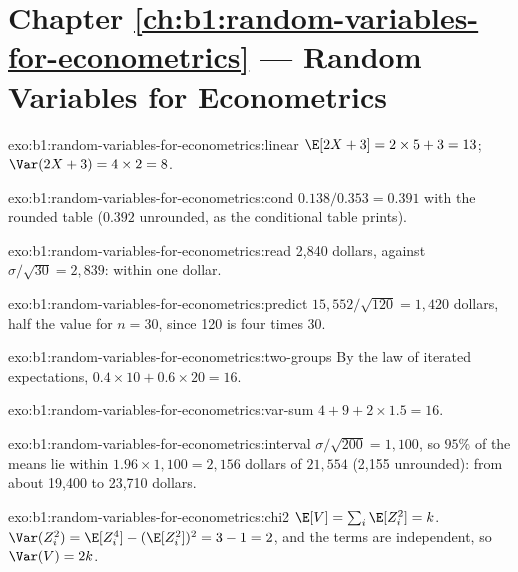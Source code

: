 \section*{Chapter \ref{ch:b1:random-variables-for-econometrics} --- Random Variables for Econometrics}

\begin{solution}{exo:b1:random-variables-for-econometrics:linear}
$\E[2X + 3] = 2 \times 5 + 3 = 13$; $\Var(2X + 3) = 4 \times 2 = 8$.
\end{solution}

\begin{solution}{exo:b1:random-variables-for-econometrics:cond}
$0.138/0.353 = 0.391$ with the rounded table ($0.392$ unrounded, as the
conditional table prints).
\end{solution}

\begin{solution}{exo:b1:random-variables-for-econometrics:read}
2,840 dollars, against $\sigma/\sqrt{30} = 2{,}839$: within one dollar.
\end{solution}

\begin{solution}{exo:b1:random-variables-for-econometrics:predict}
$15{,}552/\sqrt{120} = 1{,}420$ dollars, half the value for $n = 30$, since 120 is four
times 30.
\end{solution}

\begin{solution}{exo:b1:random-variables-for-econometrics:two-groups}
By the law of iterated expectations, $0.4 \times 10 + 0.6 \times 20 = 16$.
\end{solution}

\begin{solution}{exo:b1:random-variables-for-econometrics:var-sum}
$4 + 9 + 2 \times 1.5 = 16$.
\end{solution}

\begin{solution}{exo:b1:random-variables-for-econometrics:interval}
$\sigma/\sqrt{200} = 1{,}100$, so $95\%$ of the means lie within $1.96 \times 1{,}100 = 2{,}156$ dollars
of $21{,}554$ (2,155 unrounded): from about 19,400 to 23,710 dollars.
\end{solution}

\begin{solution}{exo:b1:random-variables-for-econometrics:chi2}
$\E[V] = \sum_i \E[Z_i^2] = k$. $\Var(Z_i^2) = \E[Z_i^4] - (\E[Z_i^2])^2 = 3 - 1 = 2$, and the terms are
independent, so $\Var(V) = 2k$.
\end{solution}

